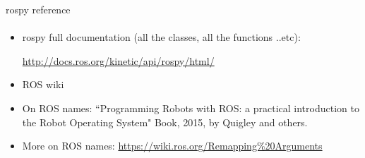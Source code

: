 \documentclass{beamer}
\begin{document}
\begin{frame}[fragile]{rospy reference}
    \framesubtitle{}

\begin{itemize}
    \item rospy full documentation (all the classes, all the functions ..etc):
    
    \vspace{0.5cm}
     \url{http://docs.ros.org/kinetic/api/rospy/html/}
     
    \item ROS wiki
    
    \item On ROS names: ``Programming Robots with ROS: a practical introduction to the Robot Operating System" Book, 2015, by Quigley and others.
    
    \item More on ROS names: \url{https://wiki.ros.org/Remapping%20Arguments}
\end{itemize}
    
\end{frame}
\end{document}
